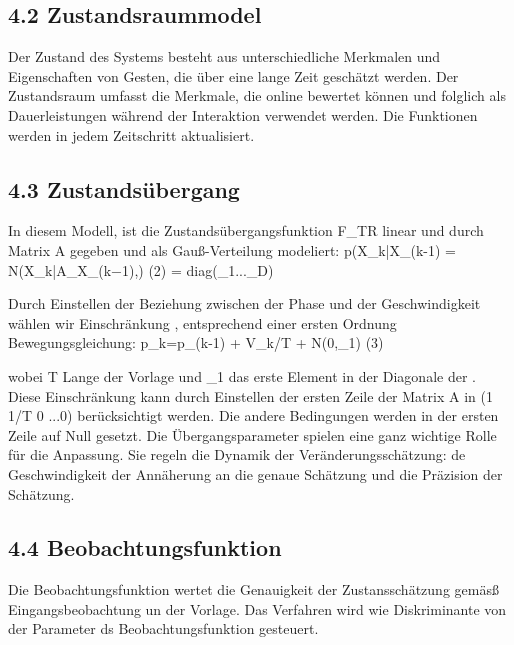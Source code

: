 \documentclass{llncs}
\begin{document}
\subsection{4.2 Zustandsraummodel}
Der Zustand des Systems besteht aus unterschiedliche Merkmalen und Eigenschaften von Gesten, die über eine lange Zeit geschätzt werden. Der Zustandsraum umfasst die Merkmale, die online bewertet können und folglich als Dauerleistungen während der Interaktion verwendet werden. Die Funktionen werden in jedem Zeitschritt aktualisiert.

\subsection{4.3 Zustandsübergang}
In diesem Modell, ist die Zustandsübergangsfunktion F_TR linear und durch Matrix A gegeben und als Gauß-Verteilung modeliert: 
p(X_k|X_(k-1) =  N(X_k|A_X_(k−1),\sum )					(2)
\sum = diag(\phi_1...\phi_D)

Durch Einstellen der Beziehung zwischen der Phase und der Geschwindigkeit wählen wir Einschränkung , entsprechend einer ersten Ordnung Bewegungsgleichung: 
p_k=p_(k-1) + V_k/T + N(0,\phi_1)						(3)

wobei T Lange der Vorlage und \phi_1 das erste Element in der Diagonale der \sum. Diese Einschränkung kann durch Einstellen der ersten Zeile der Matrix A in (1 1/T 0 ...0) berücksichtigt werden. Die andere Bedingungen werden in der ersten Zeile auf Null gesetzt.
Die Übergangsparameter spielen eine ganz wichtige Rolle für die Anpassung. Sie regeln die Dynamik  der Veränderungsschätzung: de Geschwindigkeit der Annäherung an die genaue Schätzung und die Präzision der Schätzung.

\subsection{4.4 Beobachtungsfunktion} 
Die Beobachtungsfunktion wertet die Genauigkeit der Zustansschätzung gemäsß Eingangsbeobachtung un der Vorlage. Das Verfahren wird wie Diskriminante von der Parameter ds Beobachtungsfunktion gesteuert.
\end{document}
